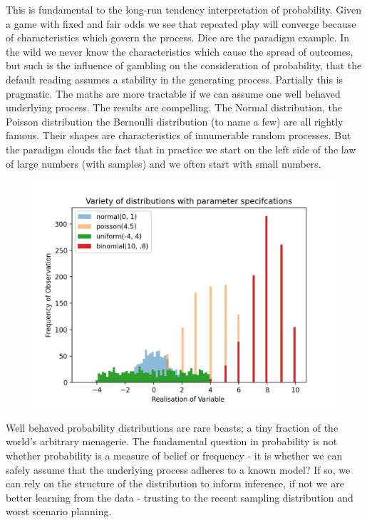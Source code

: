 \documentclass[10pt,a4paper,notitlepage,twocolumn]{article}
\begin{document}
\noindent This is fundamental to the long-run tendency interpretation of probability. Given a game with fixed and fair odds we see that repeated play will converge because of characteristics which govern the process. Dice are the paradigm example.  In the wild we never know the characteristics which cause the spread of outcomes, but such is the influence of gambling on the consideration of probability, that the default reading assumes a stability in the generating process. Partially this is pragmatic. The maths are more tractable if we can assume one well behaved underlying process. The results are compelling. The Normal distribution, the Poisson distribution the Bernoulli distribution (to name a few) are all rightly famous. Their shapes are characteristics of innumerable random processes. But the paradigm clouds the fact that in practice we start on the left side of the law of large numbers (with samples) and we often start with small numbers. 
\begin{figure}[H]
  \includegraphics[width=\linewidth]{./Plots/variety_of_distributions.png}
\end{figure}
Well behaved probability distributions are rare beasts; a tiny fraction of the world's arbitrary menagerie. The fundamental question in probability is not whether probability is a measure of belief or frequency - it is whether we can safely assume that the underlying process adheres to a known model? If so, we can rely on the structure of the distribution to inform inference, if not we are better learning from the data - trusting to the recent sampling distribution and worst scenario planning.
\end{document}
